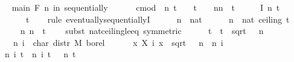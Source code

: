 {\ \ \isamarkupfalse%
\ main{\isacharcolon}\ {\isachardoublequoteopen}{\isasymforall}\isactrlsub F\ n\ in\ sequentially{\isachardot}\isanewline
\ \ \ \ \ \ cmod\ {\isacharparenleft}{\isasymphi}\ n\ t\ {\isacharminus}\ {\isacharparenleft}{}\ {\isacharplus}\ {\isacharparenleft}{\isacharminus}{\isacharparenleft}t{\isacharcircum}{}{\isacharparenright}\ {\isacharslash}\ {}{\isacharparenright}\ {\isacharslash}\ n{\isacharparenright}{\isacharcircum}n{\isacharparenright}\ {\isasymle}\ t\ {\isacharslash}\ {\isacharparenleft}{}\ {\isacharasterisk}\ {\isasymsigma}\ {\isacharasterisk}\ {\isacharquery}I\ n\ t{\isachardoublequoteclose}\isanewline
\ \ \ \ \ \ \ t\isanewline
\ \ \isamarkupfalse%
\ {\isacharparenleft}rule\ eventually{\isacharunderscore}sequentiallyI{\isacharparenright}\isanewline
\ \ \ \ \isamarkupfalse%
\ n\ {\isacharcolon}{\isacharcolon}\ nat\isanewline
\ \ \ \ \isamarkupfalse%
\ {\isachardoublequoteopen}n\ {\isasymge}\ nat\ {\isacharparenleft}ceiling\ {\isacharparenleft}t{\isacharcircum}{}\ {\isacharslash}\ {}{\isacharparenright}{\isacharparenright}{\isachardoublequoteclose}\isanewline
\ \ \ \ \isamarkupfalse%
\ n{\isacharcolon}\ {\isachardoublequoteopen}n\ {\isasymge}\ t{\isacharcircum}{}\ {\isacharslash}\ {}{\isachardoublequoteclose}\ \isamarkupfalse%
\ {\isacharparenleft}subst\ nat{\isacharunderscore}ceiling{\isacharunderscore}le{\isacharunderscore}eq\ {\isacharbrackleft}symmetric{\isacharbrackright}{\isacharparenright}\isanewline
\ \ \ \ \isamarkupfalse%
\ {\isacharquery}t\ {\isacharequal}\ {\isachardoublequoteopen}t\ {\isacharslash}\ sqrt\ {\isacharparenleft}{\isasymsigma}\ {\isacharasterisk}\ n{\isacharparenright}{\isachardoublequoteclose}\isanewline
\isanewline
\ \ \ \ \isamarkupfalse%
\ {\isasympsi}{\isacharprime}\ \ {\isachardoublequoteopen}{\isasympsi}{\isacharprime}\ n\ i\ {\isacharequal}\ char\ {\isacharparenleft}distr\ M\ borel\isanewline
\ \ \ \ \ \ {\isacharparenleft}{\isasymlambda}x{\isachardot}\ X\ i\ x\ {\isacharslash}\ sqrt\ {\isacharparenleft}{\isasymsigma}\ {\isacharasterisk}\ n{\isacharparenright}{\isacharparenright}{\isacharparenright}{\isachardoublequoteclose}\ \ n\ i\isanewline
\ \ \ \ \isamarkupfalse%
\ {\isacharasterisk}{\isacharcolon}\ {\isachardoublequoteopen}{\isasymAnd}n\ i\ t{\isachardot}\ {\isasympsi}{\isacharprime}\ n\ i\ t\ {\isacharequal}\ {\isasympsi}\ n\ t{\isachardoublequoteclose}\isanewline
}
